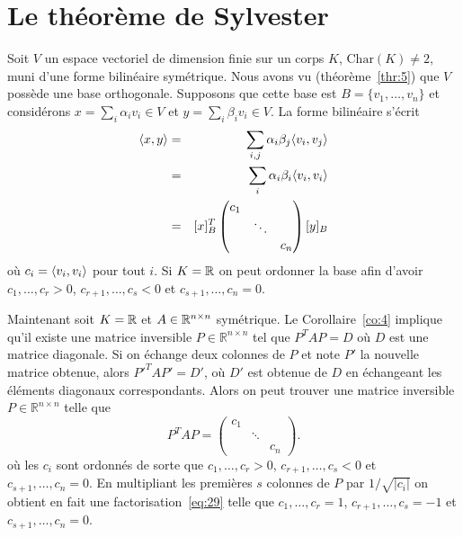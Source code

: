 \section{Le théorème de Sylvester}
\label{sec:le-theoreme-de}




Soit $V$ un espace vectoriel de dimension finie sur un corps $K$, $\mathrm{Char}(K) \neq 2$, muni d'une forme bilinéaire symétrique. Nous avons vu (théorème~\ref{thr:5}) que $V$ possède une base orthogonale. Supposons que cette base est $B = \{v_1,\dots,v_n\}$ et considérons $x = \sum_i \alpha_i v_i \in V$ et $y = \sum_i \beta_i v_i \in V$. La forme bilinéaire  s'écrit 
\begin{eqnarray*}
  \langle {x,y} \rangle & =  & \sum_{i, j} \alpha_i \beta_j \langle {v_i,v_j} \rangle \\
              & = & \sum_i \alpha_i \beta_i \langle {v_i,v_i} \rangle \\
               & = & [x]_B^T 
                    \begin{pmatrix}
                      c_1 & & \\
                                     & \ddots & \\
                                     & & c_n
                    \end{pmatrix} [y]_B
\end{eqnarray*}
où $c_i = \langle {v_i,v_i} \rangle$ pour tout $i$. 
Si $K = \mathbb{R}$ on peut ordonner la base afin d'avoir $c_1,\dots,c_r>0$, $c_{r+1},\dots,c_s < 0$ et $c_{s+1},\dots,c_n = 0$.



Maintenant soit $K = \mathbb{R}$  et $A \in \mathbb{R}^{n \times n}$ symétrique. Le Corollaire~\ref{co:4} implique qu'il existe une matrice inversible $P ∈ ℝ^{n \times n}$ tel que $P^T A P = D$ où $D$ est une matrice diagonale. Si on échange deux colonnes de $P$ et note $P'$ la nouvelle matrice obtenue, alors $P'^T A P' = D'$, où $D'$ est obtenue de $D$ en échangeant les éléments diagonaux correspondants. Alors on peut trouver une matrice inversible $P ∈ ℝ^{n ×n}$ telle que 
\begin{equation}
  \label{eq:29}
  P^T A {P} =
    \begin{pmatrix}
      c_1\\
      & \ddots \\
      && c_n
    \end{pmatrix}. 
\end{equation}
où les  $c_i$ sont ordonnés de sorte que  $c_1,\dots, c_r >0$, $c_{r+1},\dots ,c_s<0$ et $c_{s+1},\dots , c_n = 0$. En multipliant les premières $s$ colonnes de $P$ par $1/ \sqrt{|c_i|}$ on obtient en fait une factorisation~\eqref{eq:29} telle que 
 $c_1,\dots, c_r =1$, $c_{r+1},\dots ,c_s=-1$ et $c_{s+1},\dots , c_n = 0$. 

